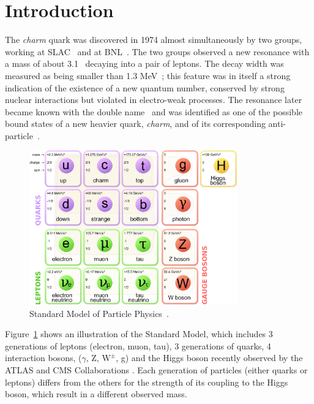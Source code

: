 \documentclass[12pt, a4paper, twoside, titlepage]{article}
\begin{document}
\section{Introduction}
The \emph{charm} quark was discovered in 1974 almost simultaneously by two groups, working at SLAC~\cite{Richter:1974} and at BNL~\cite{Ting:1974}.
The two groups observed a new resonance with a mass of about 3.1 \GeVcsq\ decaying into a pair of leptons.
The decay width was measured as being smaller than 1.3 MeV~\cite{Richter:1974}; this feature
was in itself a strong indication of the existence of a new quantum number, conserved by strong nuclear interactions 
but violated in electro-weak processes.
The resonance later became known with the double name \jpsi\ and was identified as one of the possible bound states
of a new heavier quark, \emph{charm}, and of its corresponding anti-particle~\cite{Appelquist:1975, DeRujula:1975}. 

\begin{figure}[tbh]
\begin{center}
\includegraphics[width=0.8\textwidth]{img/standard_model}
 \caption{Standard Model of Particle Physics~\cite{Wikipedia:StandardModel}.} 
 \label{fig:standard_model}
\end{center}
\end{figure}

Figure~\ref{fig:standard_model} shows an illustration of the Standard Model, which includes
3 generations of leptons (electron, muon, tau), 3 generations of quarks, 4 interaction bosons, ($\gamma$, Z, $\mathrm{W}^{\pm}$, g) and the Higgs boson
recently observed by the ATLAS and CMS Collaborations \cite{ATLAS:2012b,CMS:2012d}.
Each generation of particles (either quarks or leptons) differs from the others for the strength of its coupling to the Higgs boson,
which result in a different observed mass.
\end{document}
